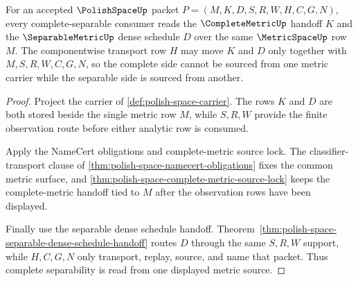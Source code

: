 \begin{theorem}
\label{thm:polish-space-complete-separable-source-lock}
For an accepted $\PolishSpaceUp$ packet $P=(M,K,D,S,R,W,H,C,G,N)$, every complete-separable consumer reads the $\CompleteMetricUp$ handoff $K$ and the $\SeparableMetricUp$ dense schedule $D$ over the same $\MetricSpaceUp$ row $M$. The componentwise transport row $H$ may move $K$ and $D$ only together with $M,S,R,W,C,G,N$, so the complete side cannot be sourced from one metric carrier while the separable side is sourced from another.
\end{theorem}
\begin{proof}
Project the carrier of \autoref{def:polish-space-carrier}. The rows $K$ and $D$ are both stored beside the single metric row $M$, while $S,R,W$ provide the finite observation route before either analytic row is consumed.

Apply the NameCert obligations and complete-metric source lock. The classifier-transport clause of \autoref{thm:polish-space-namecert-obligations} fixes the common metric surface, and \autoref{thm:polish-space-complete-metric-source-lock} keeps the complete-metric handoff tied to $M$ after the observation rows have been displayed.

Finally use the separable dense schedule handoff. Theorem~\ref{thm:polish-space-separable-dense-schedule-handoff} routes $D$ through the same $S,R,W$ support, while $H,C,G,N$ only transport, replay, source, and name that packet. Thus complete separability is read from one displayed metric source.
\end{proof}

